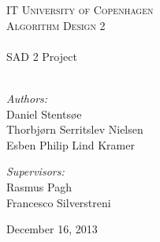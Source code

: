 \begin{titlepage}

\begin{center}


\textsc{\LARGE IT University of Copenhagen}\\[1cm]

\textsc{\Large Algorithm Design 2}\\[1cm]

\HRule \\[0.6cm]
{ \Huge SAD 2 Project}\\[0.4cm]
\HRule \\[1.5cm]


\begin{minipage}[t]{0.6\textwidth}
\begin{flushleft} \large
\emph{Authors:}\\[0.5cm]
Daniel Stentsøe\\
Thorbjørn Serritslev Nielsen\\
Esben Philip Lind Kramer
\end{flushleft}
\end{minipage}
\begin{minipage}[t]{0.35\textwidth}
\begin{flushright} \large
\emph{Supervisors:} \\[0.5cm]
Rasmus Pagh \\
Francesco Silverstreni \\
\end{flushright}
\end{minipage}

\vfill

\Large December 16, 2013

\end{center}

\end{titlepage}